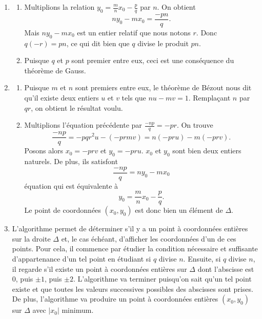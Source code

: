 \documentclass[11pt,a4paper]{article}
\begin{document}
	\begin{corrige}
		\begin{enumerate}
			
			\item 
			
			\begin{enumerate}
				
				\item  Multiplions la relation $y_0=\frac mn x_0-\frac pq$ par $n$. On obtient 
				$$ny_0-mx_0=\frac{-pn}q.$$
				Mais $ny_0-mx_0$ est un entier relatif que nous notons $r$. Donc $q(-r)=pn$, ce qui dit bien que $q$ divise le produit $pn$.
				
				\item  Puisque $q$ et $p$ sont premier entre eux, ceci est une conséquence du théorème de Gauss.
				
			\end{enumerate}
			
			
			\item  
			
			\begin{enumerate}
				
				\item  Puisque $m$ et $n$ sont premiers entre eux, le théorème de Bézout nous dit qu'il existe deux entiers $u$ et $v$ tels que $nu-mv=1$. Remplaçant $n$ par $qr$, on obtient le résultat voulu.
				
				\item  Multiplions l'équation précédente par $\frac{-np}{q}=-pr$. On trouve
				$$\frac{-np}q=-pqr^2 u-(-prmv)=n(-pru)-m(-prv).$$ Posons alors $x_0=-prv$ et $y_0=-pru$. $x_0$ et $y_0$ sont bien deux entiers naturels. De plus, ils satisfont 
				$$\frac{-np}{q}=ny_0-mx_0$$
				équation qui est équivalente à 
				$$y_0=\frac mn x_0-\frac pq.$$
				Le point de coordonnées $(x_0,y_0)$ est donc bien un élément de $\Delta$.
				
			\end{enumerate}
			
			
			\item  L'algorithme permet de déterminer s'il y a un point à coordonnées entières sur la droite $\Delta$ et, le cas échéant, d'afficher les coordonnées d'un de ces points. Pour cela, il commence par étudier la condition nécessaire et suffisante d'appartenance d'un tel point en étudiant si $q$ divise $n$. Ensuite, si $q$ divise $n$, il regarde s'il existe un point à coordonnées entières sur $\Delta$ dont l'abscisse est 0, puis $\pm 1$, puis $\pm 2$. L'algorithme va terminer puisqu'on sait qu'un tel point existe et que toutes les valeurs successives possibles des abscisses sont prises. De plus, l'algorithme va produire un point à coordonnées entières $(x_0,y_0)$ sur $\Delta$ avec $|x_0|$ minimum.
			
		\end{enumerate}
	\end{corrige}
	
\end{document}
